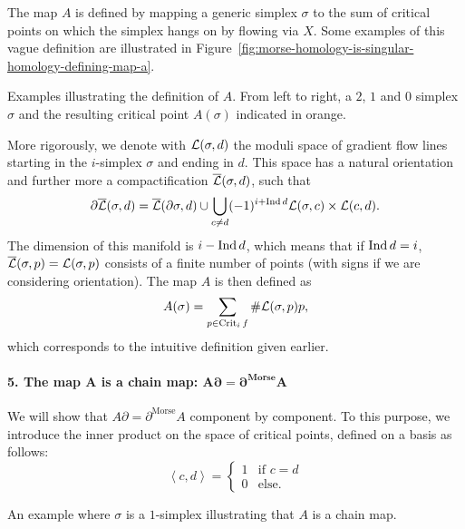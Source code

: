 \begin{myproof}
    The map $A$ is defined by mapping a generic simplex $\sigma$ to the sum of critical points on which the simplex hangs on by flowing via $X$.
    Some examples of this vague definition are illustrated in Figure~\ref{fig:morse-homology-is-singular-homology-defining-map-a}.
    \begin{marginfigure}
        \centering
        \caption{
            Examples illustrating the definition of $A$.
            From left to right, a $2$, $1$ and  $0$ simplex $\sigma$ and the resulting critical point $A(\sigma)$ indicated in orange.
        }
        \label{fig:morse-homology-is-singular-homology-defining-map-a}
    \end{marginfigure}
    More rigorously, we denote with $\mathcal L(\sigma, d)$ the moduli space of gradient flow lines starting in the $i$-simplex $\sigma$ and ending in $d$.
    This space has a natural orientation and further more a compactification $\overline{\mathcal L}(\sigma, d)$, such that
    \[
    \partial \overline{\mathcal L}(\sigma, d) = \overline{\mathcal L}(\partial \sigma, d) \cup \bigcup_{c \neq d}  (-1)^{i + \operatorname{Ind} d} \mathcal L(\sigma, c) \times \mathcal L(c, d)
    .\] 
    The dimension of this manifold is $i - \operatorname{Ind} d$, which means that if  $\operatorname{Ind} d = i$,  $\overline{\mathcal L}(\sigma, p) = \mathcal L(\sigma, p)$ consists of a finite number of points (with signs if we are considering orientation).
    The map $A$ is then defined as
    \[
        A(\sigma) = \sum_{p \in \operatorname{Crit}_i f} \# \mathcal L(\sigma, p) p
    ,\] 
    which corresponds to the intuitive definition given earlier.


    \paragraph{5. The map  $\bm A$ is a chain map:  $\bm{A \partial = \partial^{\text{Morse}} A}$ }
    We will show that $A \partial = \partial^{\text{Morse}} A$ component by component. To this purpose, we introduce the inner product on the space of critical points, defined on a basis as follows:
    \[
        \left<c, d \right> = \begin{cases}
            1 & \text{if $c = d$}\\
            0 & \text{else.}
        \end{cases}
    \] 
\begin{marginfigure}
    \centering
    \caption{An example where $\sigma$ is a $1$-simplex illustrating that  $A$ is a chain map.}
    \label{fig:a-is-a-chain-map}
\end{marginfigure}


\end{myproof}
